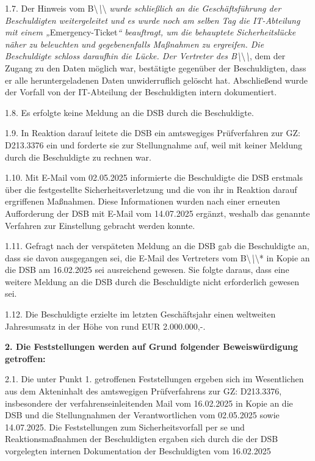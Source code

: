 \documentclass[11pt,a4paper]{article}
\begin{document}
1.7. Der Hinweis vom B\textbackslash{}\textit{\textbackslash{}}\textbackslash{}\textit{ wurde schließlich an die Geschäftsführung der Beschuldigten weitergeleitet und es wurde noch am selben Tag die IT-Abteilung mit einem „}Emergency-Ticket\textit{“ beauftragt, um die behauptete Sicherheitslücke näher zu beleuchten und gegebenenfalls Maßnahmen zu ergreifen. Die Beschuldigte schloss daraufhin die Lücke. Der Vertreter des B\textbackslash{}}\textbackslash{}\textit{\textbackslash{}}, dem der Zugang zu den Daten möglich war, bestätigte gegenüber der Beschuldigten, dass er alle heruntergeladenen Daten unwiderruflich gelöscht hat. Abschließend wurde der Vorfall von der IT-Abteilung der Beschuldigten intern dokumentiert.

1.8. Es erfolgte keine Meldung an die DSB durch die Beschuldigte.

1.9. In Reaktion darauf leitete die DSB ein amtswegiges Prüfverfahren zur GZ: D213.3376 ein und forderte sie zur Stellungnahme auf, weil mit keiner Meldung durch die Beschuldigte zu rechnen war.

1.10. Mit E-Mail vom 02.05.2025 informierte die Beschuldigte die DSB erstmals über die festgestellte Sicherheitsverletzung und die von ihr in Reaktion darauf ergriffenen Maßnahmen. Diese Informationen wurden nach einer erneuten Aufforderung der DSB mit E-Mail vom 14.07.2025 ergänzt, weshalb das genannte Verfahren zur Einstellung gebracht werden konnte.

1.11. Gefragt nach der verspäteten Meldung an die DSB gab die Beschuldigte an, dass sie davon ausgegangen sei, die E-Mail des Vertreters vom B\textbackslash{}\textit{\textbackslash{}}\textbackslash{}* in Kopie an die DSB am 16.02.2025 sei ausreichend gewesen. Sie folgte daraus, dass eine weitere Meldung an die DSB durch die Beschuldigte nicht erforderlich gewesen sei.

1.12. Die Beschuldigte erzielte im letzten Geschäftsjahr einen weltweiten Jahresumsatz in der Höhe von rund EUR 2.000.000,-.

\textbf{2. Die Feststellungen werden auf Grund folgender Beweiswürdigung getroffen:}

2.1. Die unter Punkt 1. getroffenen Feststellungen ergeben sich im Wesentlichen aus dem Akteninhalt des amtswegigen Prüfverfahrens zur GZ: D213.3376, insbesondere der verfahrenseinleitenden Mail vom 16.02.2025 in Kopie an die DSB und die Stellungnahmen der Verantwortlichen vom 02.05.2025 sowie 14.07.2025. Die Feststellungen zum Sicherheitsvorfall per se und Reaktionsmaßnahmen der Beschuldigten ergaben sich durch die der DSB vorgelegten internen Dokumentation der Beschuldigten vom 16.02.2025
\end{document}
